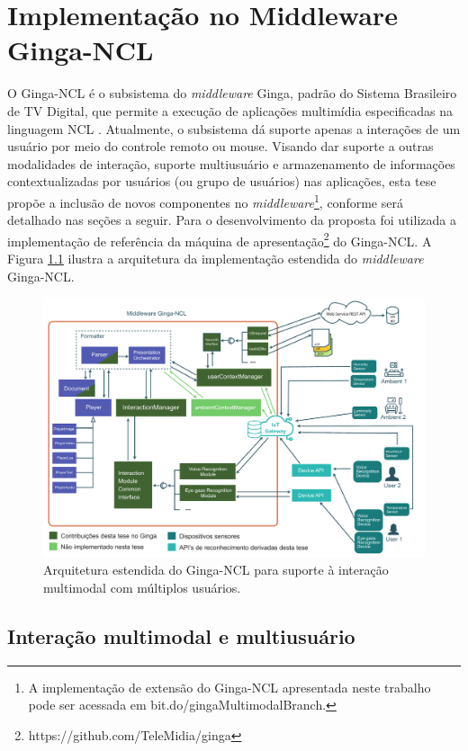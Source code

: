 \chapter{Implementação no Middleware Ginga-NCL} \label{cap:cap5}

O Ginga-NCL é o subsistema do \textit{middleware} Ginga, padrão do Sistema Brasileiro de TV Digital, que permite a execução de aplicações multimídia especificadas na linguagem NCL \cite{ABNT:2011aa}. Atualmente, o subsistema dá suporte apenas a interações de um usuário por meio do controle remoto ou mouse. Visando dar suporte a outras modalidades de interação, suporte multiusuário e armazenamento de informações contextualizadas por usuários (ou grupo de usuários) nas aplicações, esta tese propõe a inclusão de novos componentes no \textit{middleware}\footnote{A implementação de extensão do Ginga-NCL apresentada neste trabalho pode ser acessada em  bit.do/gingaMultimodalBranch.}, conforme será detalhado nas seções a seguir. %
Para o desenvolvimento da proposta foi utilizada a implementação de referência da máquina de apresentação\footnote{https://github.com/TeleMidia/ginga} do Ginga-NCL. A Figura \ref{fig:arquitetura} ilustra a arquitetura da implementação estendida do \textit{middleware} Ginga-NCL.

\begin{figure}[h!]
    \centering
    \includegraphics[scale=0.43, keepaspectratio=true]{figuras/ArqPropExt.pdf}
    \caption{Arquitetura estendida do Ginga-NCL para suporte à interação multimodal com múltiplos usuários.}
    \label{fig:arquitetura}
\end{figure}

\section{Interação multimodal e multiusuário}


